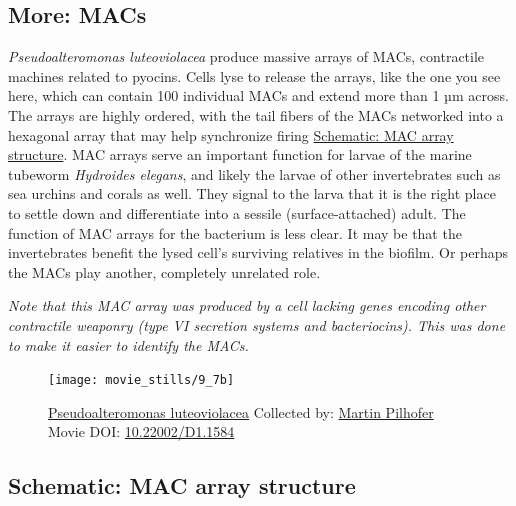\documentclass[]{tufte-book}
\begin{document}
\hypertarget{MACs}{\subsection*{More: MACs}\label{MACs}}

\emph{Pseudoalteromonas luteoviolacea} produce massive arrays of MACs,
contractile machines related to pyocins. Cells lyse to release the
arrays, like the one you see here, which can contain 100 individual MACs
and extend more than 1 µm across. The arrays are highly ordered, with
the tail fibers of the MACs networked into a hexagonal array that may
help synchronize firing
\protect\hyperlink{MAC_array_structure}{Schematic: MAC array structure}.
MAC arrays serve an important function for larvae of the marine tubeworm
\emph{Hydroides elegans}, and likely the larvae of other invertebrates
such as sea urchins and corals as well. They signal to the larva that it
is the right place to settle down and differentiate into a sessile
(surface-attached) adult. The function of MAC arrays for the bacterium
is less clear. It may be that the invertebrates benefit the lysed cell's
surviving relatives in the biofilm. Or perhaps the MACs play another,
completely unrelated role.

\emph{Note that this MAC array was produced by a cell lacking genes
encoding other contractile weaponry (type VI secretion systems and
bacteriocins). This was done to make it easier to identify the MACs.}





\begin{figure}
\texttt{[image: movie\_stills/9\_7b]} \caption[\protect\hyperlink{tree}{Pseudoalteromonas luteoviolacea}
Collected by: \protect\hyperlink{martin_pilhofer}{Martin Pilhofer} Movie
DOI: \href{https://doi.org/10.22002/D1.1584}{10.22002/D1.1584}]{\protect\hyperlink{tree}{Pseudoalteromonas luteoviolacea}
Collected by: \protect\hyperlink{martin_pilhofer}{Martin Pilhofer} Movie
DOI: \href{https://doi.org/10.22002/D1.1584}{10.22002/D1.1584}}\label{fig:9-7b}
\end{figure}

\hypertarget{MAC_array_structure}{\subsection*{Schematic: MAC array
structure}\label{MAC_array_structure}}
\end{document}
